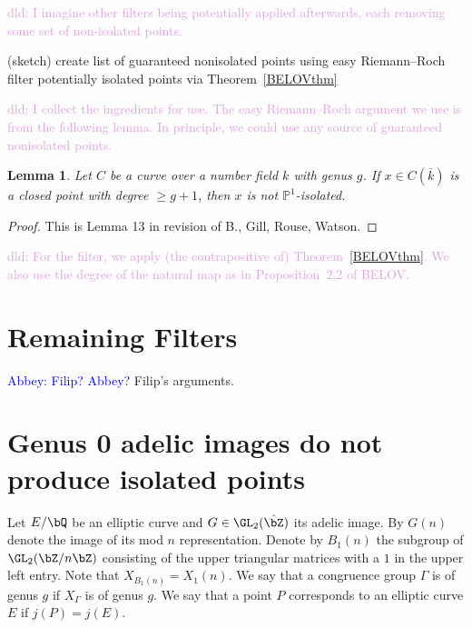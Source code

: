 \documentclass[11pt,reqno]{amsart}
\theoremstyle{plain}
\newtheorem{lemma}[theorem]{Lemma}
\theoremstyle{definition}
\newcommand{\Q}{\bQ}
\newcommand{\Z}{\bZ}
\newcommand{\abbey}[1]{\textcolor{blue}{Abbey: #1}}
\newcommand{\dld}[1]{\textcolor{Plum}{dld: #1}}
\begin{document}
\dld{I imagine other filters being potentially applied afterwards, each
removing some set of non-isolated points.}

\begin{algorithm}[H]\label{alg:level_mapping}
  (sketch)\;
  create list of guaranteed nonisolated points using easy Riemann--Roch\;
  filter potentially isolated points via Theorem~\ref{BELOVthm}\;
\end{algorithm}

\dld{I collect the ingredients for use. The easy Riemann--Roch argument we use
is from the following lemma. In principle, we could use any source of
guaranteed nonisolated points.}

\begin{lemma}
Let $C$ be a curve over a number field $k$ with genus $g$. If $x \in C(\overline{k})$ is a closed point with degree
$\geq g+1$, then $x$ is not $\mathbb{P}^{1}$-isolated.
\end{lemma}

\begin{proof}
This is Lemma 13 in revision of B., Gill, Rouse, Watson.
\end{proof}

\dld{For the filter, we apply (the contrapositive of) Theorem~\ref{BELOVthm}.
We also use the degree of the natural map as in Proposition~2.2 of BELOV.}

\section{Remaining Filters}
\abbey{Filip? Abbey?}
Filip's arguments.



\section{Genus 0 adelic images do not produce isolated points}

Let $E/ \Q$ be an elliptic curve and $G\in \GL_2(\hat \Z)$ its adelic image. By $G(n)$ denote the image of its mod $n$ representation. Denote by $B_1(n)$ the subgroup of $\GL_2(\Z/n\Z)$ consisting of the upper triangular matrices with a $1$ in the upper left entry. Note that $X_{B_1(n)}=X_1(n)$. We say that a congruence group $\Gamma$ is of genus $g$ if $X_\Gamma$ is of genus $g$. We say that a point $P$ corresponds to an elliptic curve $E$ if $j(P)=j(E)$.
\end{document}
